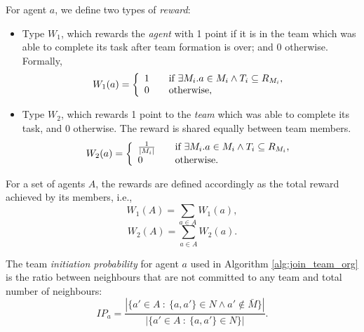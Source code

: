 \documentclass{llncs}
\newcommand{\comment}[1]{{\color{red}{[\sf #1]}}}
\begin{document}
\begin{definition}[Rewards]
For agent $a$, we define two types of \emph{reward}:
\begin{itemize}
    \item Type $W_1$, which rewards the \emph{agent} with 1 point if it is in the team which was able to complete its task after team formation is over; and 0 otherwise. Formally,
    \begin{equation} \label{eq:w1agent}
W_1(a) = \left\{
  \begin{array}{l l}
    1 & \quad \text{if $\exists M_i . a \in M_i \wedge T_i \subseteq R_{M_i}$,}\\
    0 & \quad \text{otherwise,}\\
  \end{array} \right.
\end{equation}

    \item Type $W_2$, which rewards 1 point to the \emph{team} which was able to complete its task, and 0 otherwise. The reward is shared equally between team members.
\begin{equation}
W_2(a) = \left\{
  \begin{array}{l l}
    \frac{1}{|M_i|} & \quad \text{if $\exists M_i . a \in M_i \wedge T_i \subseteq R_{M_i}$,}\\
    0 & \quad \text{otherwise.}\\
  \end{array} \right.
\label{eq:w2agent}
\end{equation}
\end{itemize}


For a set of agents $A$, the rewards are defined accordingly as the total reward achieved by its members, i.e.,
\begin{equation}
 W_1(A) = \sum_{a \in A} W_1(a),
\label{eq:w1organisation}
\end{equation}
\begin{equation}
 W_2(A) = \sum_{a \in A} W_2(a).
\label{eq:w2organisation}
\end{equation}
\end{definition}

\comment{TL: move to next section?}
\begin{definition}
The team \emph{initiation probability} for agent $a$ used in Algorithm \ref{alg:join_team_org} is the ratio between neighbours that are not committed to any team and total number of neighbours:
\begin{equation}
IP_a = \frac{|\{ a' \in A\ :\ \{a, a'\} \in N \wedge a' \notin \bar{M}  \}|}{|\{ a' \in A\ :\ \{a, a'\} \in N \}|}.
\label{eq:init_prob}
\end{equation}
\end{definition}
\end{document}

